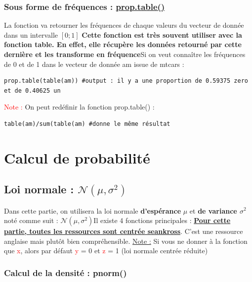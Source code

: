 \documentclass{article}
\newcommand{\argument}[1]{\textcolor{red}{#1}}
\begin{document}
\subsubsection{Sous forme de fréquences : \href{https://www.rdocumentation.org/packages/base/versions/3.6.2/topics/prop.table}{prop.table()}} 
La fonction va retourner les fréquences de chaque valeurs du vecteur de donnée dans un intervalle $[0;1]$\newline
\textbf{Cette fonction est très souvent utiliser avec la fonction table. En effet, elle récupère les données retourné par cette dernière et les transforme en fréquence}\newline Si on veut connaître les fréquences de 0 et de 1 dans le vecteur de donnée am issue de mtcars : 
\begin{verbatim}
prop.table(table(am)) #output : il y a une proportion de 0.59375 zero et de 0.40625 un
\end{verbatim}
\argument{Note : } On peut redéfinir la fonction prop.table() : 
\begin{verbatim}
table(am)/sum(table(am) #donne le même résultat
\end{verbatim}
\newpage

\section{Calcul de probabilité}
\subsection{Loi normale : $\mathcal{N}(\mu, {\sigma}^2)$}
Dans cette partie, on utilisera la loi normale \textbf{d'espérance} $\mu$ et \textbf{de variance ${\sigma}^2$} noté comme suit : $\mathcal{N}(\mu, {\sigma}^2)$\newline Il existe 4 fonctions principales : \newline \textbf{\large{\href{http://seankross.com/notes/dpqr/}{Pour cette partie, toutes les ressources sont centrée seankross}}}. C'est une ressource anglaise mais plutôt bien compréhensible.\newline
\underline{Note :} Si vous ne donner à la fonction que \argument{x}, alors par défaut \argument{y} = 0 et \argument{z} = 1 (loi normale centrée réduite)
\subsubsection{Calcul de la densité : pnorm()}
\end{document}

